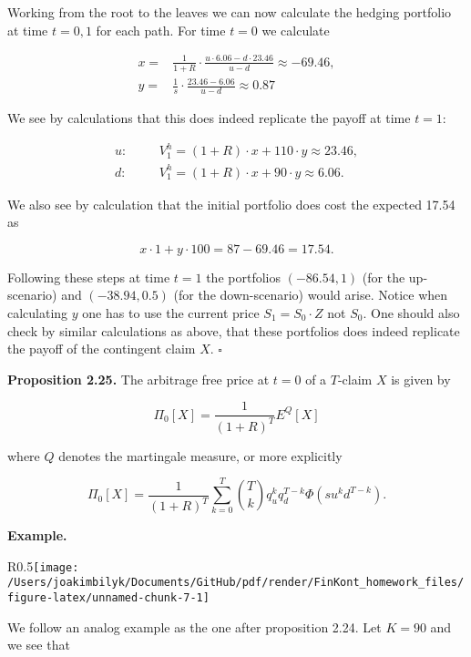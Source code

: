 \documentclass[
]{article}
\begin{document}
Working from the root to the leaves we can now calculate the hedging
portfolio at time \(t=0,1\) for each path. For time \(t=0\) we calculate

\begin{align*}
x=&\frac{1}{1+R}\cdot \frac{u\cdot 6.06-d\cdot 23.46}{u-d}\approx -69.46,\\
y=&\frac{1}{s}\cdot\frac{23.46-6.06}{u-d}\approx0.87
\end{align*}

We see by calculations that this does indeed replicate the payoff at
time \(t=1\):

\begin{align*}
u:\hspace{20pt}&V_1^h=(1+R)\cdot x + 110\cdot y\approx 23.46,\\
d:\hspace{20pt}&V_1^h=(1+R)\cdot x + 90\cdot y\approx 6.06.
\end{align*}

We also see by calculation that the initial portfolio does cost the
expected 17.54 as

\[
x\cdot 1+y\cdot100=87-69.46=17.54.
\]

Following these steps at time \(t=1\) the portfolios \((-86.54,1)\) (for
the up-scenario) and \((-38.94,0.5)\) (for the down-scenario) would
arise. Notice when calculating \(y\) one has to use the current price
\(S_1=S_0\cdot Z\) not \(S_0\). One should also check by similar
calculations as above, that these portfolios does indeed replicate the
payoff of the contingent claim \(X\). \(\square\)

\textbf{Proposition 2.25.} The arbitrage free price at \(t=0\) of a
\(T\)-claim \(X\) is given by

\[
\Pi_0[X]=\frac{1}{(1+R)^T}E^Q[X]
\]

where \(Q\) denotes the martingale measure, or more explicitly

\[
\Pi_0[X]=\frac{1}{(1+R)^T}\sum_{k=0}^T\binom{T}{k}q_u^kq_d^{T-k}\Phi(su^kd^{T-k}).
\]

\textbf{Example.}

\begin{wrapfigure}{R}{0.5\textwidth}\texttt{[image: /Users/joakimbilyk/Documents/GitHub/pdf/render/FinKont\_homework\_files/figure-latex/unnamed-chunk-7-1]}\end{wrapfigure}

We follow an analog example as the one after proposition 2.24. Let
\(K=90\) and we see that
\end{document}
